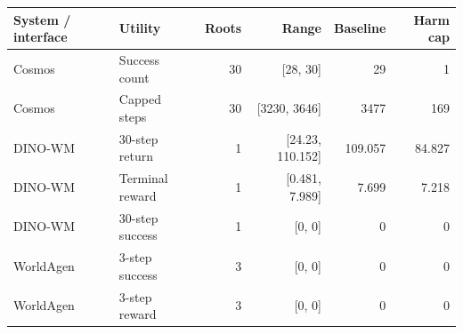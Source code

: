 \begin{tabular}{llrrrr}
\hline
System / interface & Utility & Roots & Range & Baseline & Harm cap \\
\hline
Cosmos & Success count & 30 & [28, 30] & 29 & 1 \\
Cosmos & Capped steps & 30 & [3230, 3646] & 3477 & 169 \\
DINO-WM & 30-step return & 1 & [24.23, 110.152] & 109.057 & 84.827 \\
DINO-WM & Terminal reward & 1 & [0.481, 7.989] & 7.699 & 7.218 \\
DINO-WM & 30-step success & 1 & [0, 0] & 0 & 0 \\
WorldAgen & 3-step success & 3 & [0, 0] & 0 & 0 \\
WorldAgen & 3-step reward & 3 & [0, 0] & 0 & 0 \\
\hline
\end{tabular}

